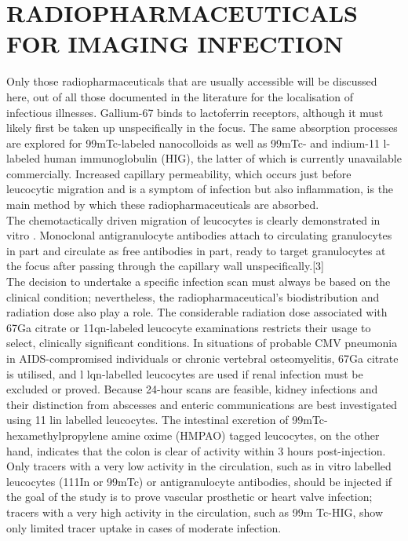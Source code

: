 \documentclass[12pt]{article}
\begin{document}
\section*{RADIOPHARMACEUTICALS FOR IMAGING INFECTION }
Only those radiopharmaceuticals that are usually accessible will be discussed here, out of all those documented in the literature for the localisation of infectious illnesses. Gallium-67 binds to lactoferrin receptors, although it must likely first be taken up unspecifically in the focus. The same absorption processes are explored for 99mTc-labeled nanocolloids as well as 99mTc- and indium-11 l-labeled human immunoglobulin (HIG), the latter of which is currently unavailable commercially. Increased capillary permeability, which occurs just before leucocytic migration and is a symptom of infection but also inflammation, is the main method by which these radiopharmaceuticals are absorbed.
\\The chemotactically driven migration of leucocytes is clearly demonstrated in vitro . Monoclonal antigranulocyte antibodies attach to circulating granulocytes in part and circulate as free antibodies in part, ready to target granulocytes at the focus after passing through the capillary wall unspecifically.[3]
\\The decision to undertake a specific infection scan must always be based on the clinical condition; nevertheless, the radiopharmaceutical's biodistribution and radiation dose also play a role. The considerable radiation dose  associated with 67Ga citrate or 11qn-labeled leucocyte examinations restricts their usage to select, clinically significant conditions. In situations of probable CMV pneumonia in AIDS-compromised individuals or chronic vertebral osteomyelitis, 67Ga citrate is utilised, and l lqn-labelled leucocytes are used if renal infection must be excluded or proved. Because 24-hour scans are feasible, kidney infections and their distinction from abscesses and enteric communications are best investigated using 11 lin labelled leucocytes. The intestinal excretion of 99mTc-hexamethylpropylene amine oxime (HMPAO) tagged leucocytes, on the other hand, indicates that the colon is clear of activity within 3 hours post-injection. Only tracers with a very low activity in the circulation, such as in vitro labelled leucocytes (111In or 99mTc) or antigranulocyte antibodies, should be injected if the goal of the study is to prove vascular prosthetic or heart valve infection; tracers with a very high activity in the circulation, such as 99m Tc-HIG, show only limited tracer uptake in cases of moderate infection.
\end{document}
